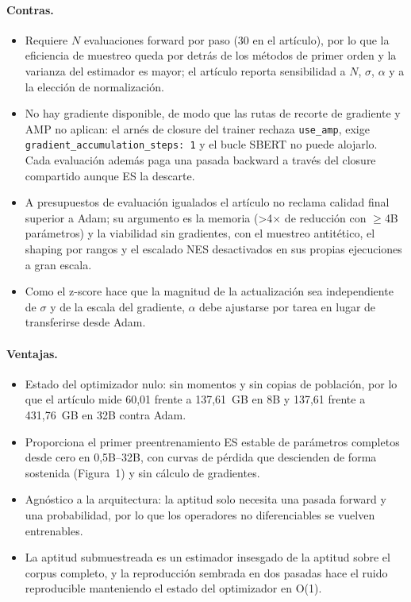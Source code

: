 \paragraph{Contras.}
\begin{itemize}[leftmargin=*]
\item Requiere $N$ evaluaciones forward por paso (30 en el artículo), por lo que la eficiencia de muestreo queda por detrás de los métodos de primer orden y la varianza del estimador es mayor; el artículo reporta sensibilidad a $N$, $\sigma$, $\alpha$ y a la elección de normalización.
\item No hay gradiente disponible, de modo que las rutas de recorte de gradiente y AMP no aplican: el arnés de closure del trainer rechaza \texttt{use\_amp}, exige \texttt{gradient\_accumulation\_steps: 1} y el bucle SBERT no puede alojarlo. Cada evaluación además paga una pasada backward a través del closure compartido aunque ES la descarte.
\item A presupuestos de evaluación igualados el artículo no reclama calidad final superior a Adam; su argumento es la memoria (>4$\times$ de reducción con $\ge$4B parámetros) y la viabilidad sin gradientes, con el muestreo antitético, el shaping por rangos y el escalado NES desactivados en sus propias ejecuciones a gran escala.
\item Como el z-score hace que la magnitud de la actualización sea independiente de $\sigma$ y de la escala del gradiente, $\alpha$ debe ajustarse por tarea en lugar de transferirse desde Adam.
\end{itemize}

\paragraph{Ventajas.}
\begin{itemize}[leftmargin=*]
\item Estado del optimizador nulo: sin momentos y sin copias de población, por lo que el artículo mide 60,01 frente a 137,61~GB en 8B y 137,61 frente a 431,76~GB en 32B contra Adam.
\item Proporciona el primer preentrenamiento ES estable de parámetros completos desde cero en 0,5B--32B, con curvas de pérdida que descienden de forma sostenida (Figura~1) y sin cálculo de gradientes.
\item Agnóstico a la arquitectura: la aptitud solo necesita una pasada forward y una probabilidad, por lo que los operadores no diferenciables se vuelven entrenables.
\item La aptitud submuestreada es un estimador insesgado de la aptitud sobre el corpus completo, y la reproducción sembrada en dos pasadas hace el ruido reproducible manteniendo el estado del optimizador en O(1).
\end{itemize}

